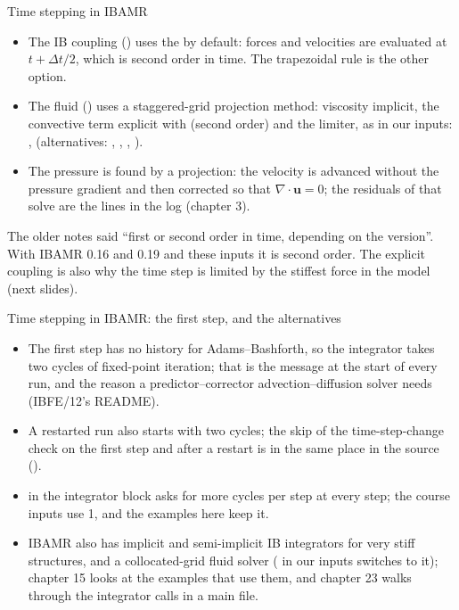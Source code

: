 \documentclass[aspectratio=169,11pt]{beamer}
\begin{document}
\begin{frame}{Time stepping in IBAMR}
\begin{itemize}
  \item The IB coupling () uses the  by default: forces and velocities are evaluated at $t + \Delta t/2$, which is second order in time. The trapezoidal rule is the other option.
  \item The fluid () uses a staggered-grid projection method: viscosity implicit, the convective term explicit with  (second order) and the  limiter, as in our inputs: ,  (alternatives: , , , ).
  \item The pressure is found by a projection: the velocity is advanced without the pressure gradient and then corrected so that $\nabla\cdot\mathbf{u} = 0$; the residuals of that solve are the  lines in the log (chapter 3).
\end{itemize}
\vspace{2mm}
\begin{punchbox}
\small The older notes said ``first or second order in time, depending on the version''. With IBAMR 0.16 and 0.19 and these inputs it is second order. The explicit coupling is also why the time step is limited by the stiffest force in the model (next slides).
\end{punchbox}
\end{frame}

\begin{frame}{Time stepping in IBAMR: the first step, and the alternatives}
\begin{itemize}
  \item The first step has no history for Adams--Bashforth, so the integrator takes two cycles of fixed-point iteration; that is the message  at the start of every run, and the reason a predictor--corrector advection--diffusion solver needs  (IBFE/12's README).
  \item A restarted run also starts with two cycles; the skip of the time-step-change check on the first step and after a restart is in the same place in the source ().
  \item {} in the integrator block asks for more cycles per step at every step; the course inputs use 1, and the examples here keep it.
  \item IBAMR also has implicit and semi-implicit IB integrators for very stiff structures, and a collocated-grid fluid solver ( in our inputs switches to it); chapter 15 looks at the examples that use them, and chapter 23 walks through the integrator calls in a main file.
\end{itemize}
\end{frame}
\end{document}
